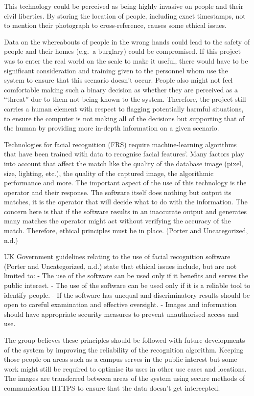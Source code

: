 \documentclass[
  english,
  a4paper,
,tablecaptionabove
]{scrartcl}
\begin{document}
This technology could be perceived as being highly invasive on people
and their civil liberties. By storing the location of people, including
exact timestamps, not to mention their photograph to cross-reference,
causes some ethical issues.

Data on the whereabouts of people in the wrong hands could lead to the
safety of people and their homes (e.g.~a burglary) could be compromised.
If this project was to enter the real world on the scale to make it
useful, there would have to be significant consideration and training
given to the personnel whom use the system to ensure that this scenario
doesn't occur. People also might not feel comfortable making such a
binary decision as whether they are perceived as a \enquote{threat} due
to them not being known to the system. Therefore, the project still
carries a human element with respect to flagging potentially harmful
situations, to ensure the computer is not making all of the decisions
but supporting that of the human by providing more in-depth information
on a given scenario.

Technologies for facial recognition (FRS) require machine-learning
algorithms that have been trained with data to recognise facial
features'. Many factors play into account that affect the match like the
quality of the database image (pixel, size, lighting, etc.), the quality
of the captured image, the algorithmic performance and more. The
important aspect of the use of this technology is the operator and their
response. The software itself does nothing but output its matches, it is
the operator that will decide what to do with the information. The
concern here is that if the software results in an inaccurate output and
generates many matches the operator might act without verifying the
accuracy of the match. Therefore, ethical principles must be in place.
(Porter and Uncategorized, n.d.)

UK Government guidelines relating to the use of facial recognition
software (Porter and Uncategorized, n.d.) state that ethical issues
include, but are not limited to: - The use of the software can be used
only if it benefits and serves the public interest. - The use of the
software can be used only if it is a reliable tool to identify people. -
If the software has unequal and discriminatory results should be open to
careful examination and effective oversight. - Images and information
should have appropriate security measures to prevent unauthorised access
and use.

The group believes these principles should be followed with future
developments of the system by improving the reliability of the
recognition algorithm. Keeping those people on areas such as a campus
serves in the public interest but some work might still be required to
optimise its uses in other use cases and locations. The images are
transferred between areas of the system using secure methods of
communication HTTPS to ensure that the data doesn't get intercepted.
\end{document}
